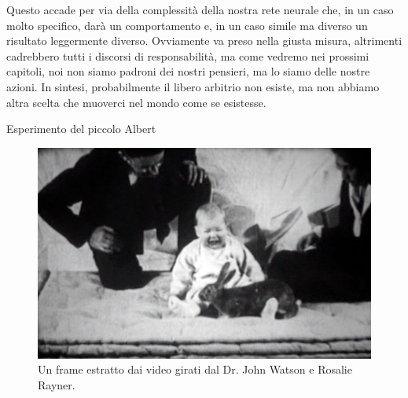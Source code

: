 \documentclass[12pt]{book} %
\begin{document}
Questo accade per via della complessità della nostra rete neurale che, in un caso molto specifico, darà un comportamento
e, in un caso simile ma diverso un risultato leggermente diverso. Ovviamente va preso nella giusta misura, altrimenti
cadrebbero tutti i discorsi di responsabilità, ma come vedremo nei prossimi capitoli, noi non siamo padroni dei nostri
pensieri, ma lo siamo delle nostre azioni. In sintesi, probabilmente il libero arbitrio non esiste, ma non abbiamo
altra scelta che muoverci nel mondo come se esistesse.

\needspace{4cm}
\begin{mdframed}[linewidth=1pt]
Esperimento del piccolo Albert

\begin{figure}
  \centering
  \includegraphics[width=0.95\linewidth]{images/Libro-img002.jpg}
  \begin{minipage}{\linewidth}
    \caption{Un frame estratto dai video girati dal Dr. John Watson e Rosalie Rayner.}
  \end{minipage}
\end{figure}


\end{mdframed}
\end{document}
